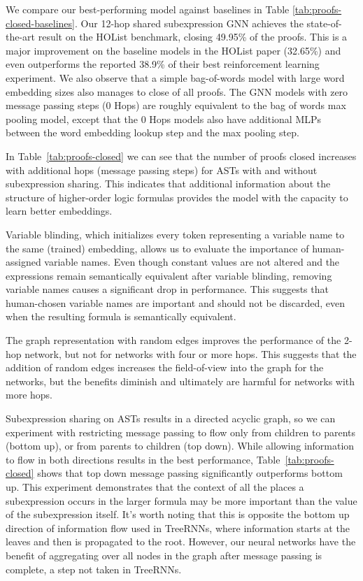 \documentclass[letterpaper]{article} \usepackage{aaai20}  \usepackage{times}  \usepackage{helvet} \usepackage{courier}  \usepackage[hyphens]{url}  \usepackage{graphicx} \urlstyle{rm} \def\UrlFont{\rm}  \usepackage{graphicx}  \frenchspacing  \setlength{\pdfpagewidth}{8.5in}  \setlength{\pdfpageheight}{11in}
\begin{document}
We compare our best-performing model against baselines in Table \ref{tab:proofs-closed-baselines}. Our 12-hop shared subexpression GNN achieves the state-of-the-art result on the HOList benchmark, closing 49.95\% of the proofs. This is a major improvement on the baseline models in the HOList paper (32.65\%) and even outperforms the reported 38.9\% of their best reinforcement learning experiment.
We also observe that a simple bag-of-words model with large word embedding sizes also manages to close  of all proofs. The GNN models with zero message passing steps (0 Hops) are roughly equivalent to the bag of words max pooling model, except that the 0 Hops models also have additional MLPs between the word embedding lookup step and the max pooling step.

In Table~\ref{tab:proofs-closed} we can see that the number of proofs closed increases with additional hops (message passing steps) for ASTs with and without subexpression sharing. This indicates that additional information about the structure of higher-order logic formulas provides the model with the capacity to learn better embeddings.

Variable blinding, which initializes every token representing a variable name to the same (trained) embedding, allows us to evaluate the importance of human-assigned variable names.
Even though constant values are not altered and the expressions remain semantically equivalent after variable blinding, removing variable names causes a significant drop in performance.
This suggests that human-chosen variable names are important and should not be discarded, even when the resulting formula is semantically equivalent.

The graph representation with random edges improves the performance of the 2-hop network, but not for networks with four or more hops. This suggests that the addition of random edges increases the field-of-view into the graph for the networks, but the benefits diminish and ultimately are harmful for networks with more hops.

Subexpression sharing on ASTs results in a directed acyclic graph, so we can experiment with restricting message passing to flow only from children to parents (bottom up), or from parents to children (top down).
While allowing information to flow in both directions results in the best performance, Table~\ref{tab:proofs-closed} shows that top down message passing significantly outperforms bottom up.
This experiment demonstrates that the context of all the places a subexpression occurs in the larger formula may be more important than the value of the subexpression itself.
It's worth noting that this is opposite the bottom up direction of information flow used in TreeRNNs, where information starts at the leaves and then is propagated to the root.
However, our neural networks have the benefit of aggregating over all nodes in the graph after message passing is complete, a step not taken in TreeRNNs.
\end{document}
